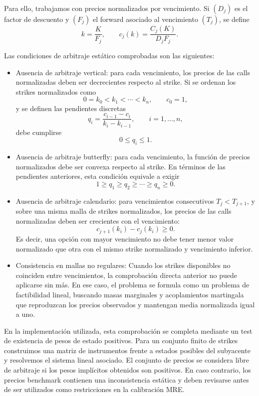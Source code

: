 Para ello, trabajamos con precios normalizados por vencimiento. Si $(D_j)$ es el factor de descuento y $(F_j)$ el forward asociado al vencimiento $(T_j)$, se define
\[
k=\frac{K}{F_j},
\qquad
c_j(k)=\frac{C_j(K)}{D_jF_j}.
\]

Las condiciones de arbitraje estático comprobadas son las siguientes:

\begin{itemize}
\item Ausencia de arbitraje vertical: para cada vencimiento, los precios de las calls normalizadas deben ser decrecientes respecto al strike. Si se ordenan los strikes normalizados como
\[
0=k_0<k_1<\cdots<k_n,
\qquad c_0=1,
\]
y se definen las pendientes discretas
\[
q_i=\frac{c_{i-1}-c_i}{k_i-k_{i-1}},
\qquad i=1,\ldots,n,
\]
debe cumplirse
\[
0\leq q_i\leq 1.
\]

\item Ausencia de arbitraje butterfly: para cada vencimiento, la función de precios normalizados debe ser convexa respecto al strike. En términos de las pendientes anteriores, esta condición equivale a exigir
\[
1\geq q_1\geq q_2\geq \cdots \geq q_n\geq 0.
\]

\item Ausencia de arbitraje calendario: para vencimientos consecutivos \(T_j<T_{j+1}\), y sobre una misma malla de strikes normalizados, los precios de las calls normalizadas deben ser crecientes con el vencimiento:
\[
c_{j+1}(k_i)-c_j(k_i)\geq 0.
\]
Es decir, una opción con mayor vencimiento no debe tener menor valor normalizado que otra con el mismo strike normalizado y vencimiento inferior.

\item Consistencia en mallas no regulares: Cuando los strikes disponibles no coinciden entre vencimientos, la comprobación directa anterior no puede aplicarse sin más. En ese caso, el problema se formula como un problema de factibilidad lineal, buscando masas marginales y acoplamientos martingala que reproduzcan los precios observados y mantengan media normalizada igual a uno.

\end{itemize}

En la implementación utilizada, esta comprobación se completa mediante un test de existencia de pesos de estado positivos. Para un conjunto finito de strikes construimos una matriz de instrumentos frente a estados posibles del subyacente y resolvemos el sistema lineal asociado. El conjunto de precios se considera libre de arbitraje si los pesos implícitos obtenidos son positivos. En caso contrario, los precios benchmark contienen una inconsistencia estática y deben revisarse antes de ser utilizados como restricciones en la calibración MRE.


